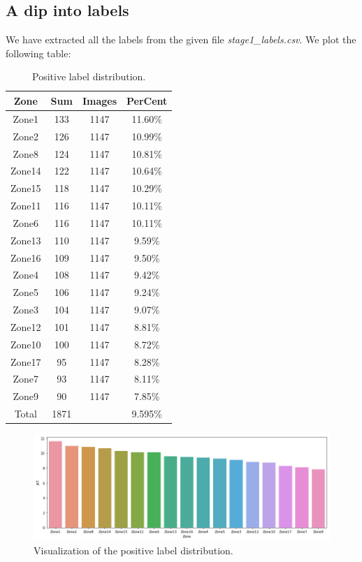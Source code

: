 \documentclass[conference,compsoc]{IEEEtran}
\begin{document}
	\subsection{A dip into labels}
		\par We have extracted all the labels from the given file \textit{stage1\_labels.csv}. We plot the following table:
		\begin{table}[h]
			\centering
			\label{labels}
			\begin{tabular}{|c|c|c|c|}
			\hline
			Zone   & Sum & Images & PerCent \\ \hline
			Zone1  & 133 & 1147  & 11.60\% \\ \hline
			Zone2  & 126 & 1147  & 10.99\% \\ \hline
			Zone8  & 124 & 1147  & 10.81\% \\ \hline
			Zone14 & 122 & 1147  & 10.64\% \\ \hline
			Zone15 & 118 & 1147  & 10.29\% \\ \hline
			Zone11 & 116 & 1147  & 10.11\% \\ \hline
			Zone6  & 116 & 1147  & 10.11\% \\ \hline
			Zone13 & 110 & 1147  & 9.59\%  \\ \hline
			Zone16 & 109 & 1147  & 9.50\%  \\ \hline
			Zone4  & 108 & 1147  & 9.42\%  \\ \hline
			Zone5  & 106 & 1147  & 9.24\%  \\ \hline
			Zone3  & 104 & 1147  & 9.07\%  \\ \hline
			Zone12 & 101 & 1147  & 8.81\%  \\ \hline
			Zone10 & 100 & 1147  & 8.72\%  \\ \hline
			Zone17 & 95  & 1147  & 8.28\%  \\ \hline
			Zone7  & 93  & 1147  & 8.11\%  \\ \hline
			Zone9  & 90  & 1147  & 7.85\%  \\ \hline
			Total  & 1871  &   & 9.595\%  \\ \hline
			\end{tabular}
			\caption{Positive label distribution.}
		\end{table}
		\begin{figure} [h]
			\centering
			\includegraphics[width=\linewidth]{../Pic/bars}
			\caption{Visualization of the positive label distribution.}
			\label{bars}
		\end{figure}
\end{document}
